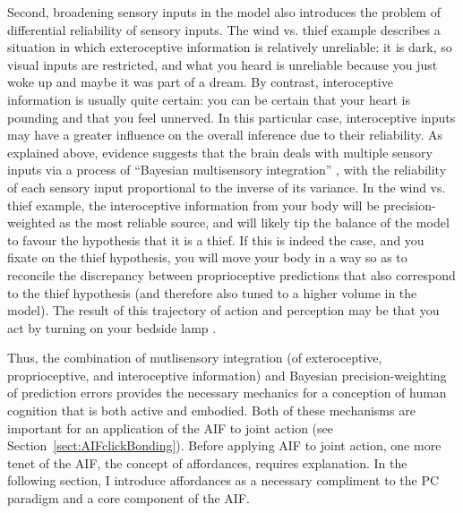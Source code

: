 \begin{CJK}{UTF8}{gbsn}
Second, broadening sensory inputs in the model also introduces the problem of differential reliability of sensory inputs.  The wind vs. thief example describes a situation in which exteroceptive information is relatively unreliable: it is dark, so visual inputs are restricted, and what you heard is unreliable because you just woke up and maybe it was part of a dream.  By contrast, interoceptive information is usually quite certain: you can be certain that your heart is pounding and that you feel unnerved.  In this particular case, interoceptive inputs may have a greater influence on the overall inference due to their reliability.  As explained above, evidence suggests that the brain deals with multiple sensory inputs via a process of ``Bayesian multisensory integration'' \citep{Ernst2004}, with the reliability of each sensory input proportional to the inverse of its variance.  In the wind vs. thief example, the interoceptive information from your body will be precision-weighted as the most reliable source, and will likely tip the balance of the model to favour the hypothesis that it is a thief.  If this is indeed the case, and you fixate on the thief hypothesis, you will move your body in a way so as to reconcile the discrepancy between proprioceptive predictions that also correspond to the thief hypothesis (and therefore also tuned to a higher volume in the model).  The result of this trajectory of action and perception may be that you act by turning on your bedside lamp \citep{Pezzulo2014}.

Thus, the combination of mutlisensory integration (of exteroceptive, proprioceptive, and interoceptive information) and Bayesian precision-weighting of prediction errors provides the necessary mechanics for a conception of human cognition that is both active and embodied.  Both of these mechanisms are important for an application of the AIF to joint action (see Section~\ref{sect:AIFclickBonding}).  Before applying AIF to joint action, one more tenet of the AIF, the concept of affordances, requires explanation.  In the following section, I introduce affordances as a necessary compliment to the PC paradigm and a core component of the AIF.






\end{CJK}
